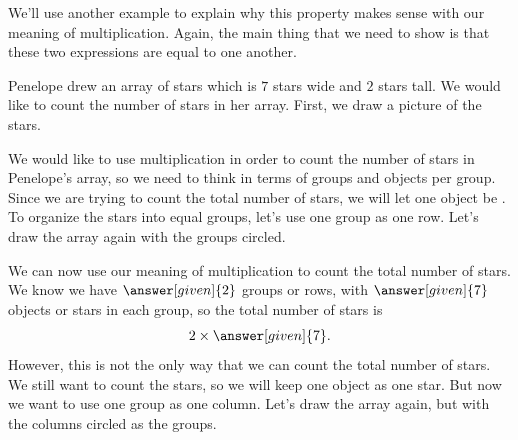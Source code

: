 \documentclass{ximera}
\begin{document}
We'll use another example to explain why this property makes sense with our meaning of multiplication. Again, the main thing that we need to show is that these two expressions are equal to one another.

\begin{example}
Penelope drew an array of stars which is $7$ stars wide and $2$ stars tall. We would like to count the number of stars in her array. First, we draw a picture of the stars.

\begin{image} \end{image}

We would like to use multiplication in order to count the number of stars in Penelope's array, so we need to think in terms of groups and objects per group. Since we are trying to count the total number of stars, we will let one object be . To organize the stars into equal groups, let's use one group as one row. Let's draw the array again with the groups circled.

\begin{image} \end{image}

We can now use our meaning of multiplication to count the total number of stars. We know we have $\answer[given]{2}$ groups or rows, with $\answer[given]{7}$ objects or stars in each group, so the total number of stars is
\[
2 \times \answer[given]{7}.
\]
However, this is not the only way that we can count the total number of stars. We still want to count the stars, so we will keep one object as one star. But now we want to use one group as one column. Let's draw the array again, but with the columns circled as the groups.


\end{example}
\end{document}

